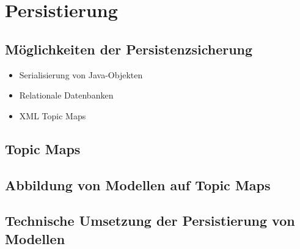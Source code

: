 \chapter{Persistierung} %
\label{cha:persistierung}

\section{Möglichkeiten der Persistenzsicherung} %
\label{sec:möglichkeiten_der_persistenzsicherung}

\begin{itemize}
	\item Serialisierung von Java-Objekten
	\item Relationale Datenbanken
	\item XML Topic Maps
\end{itemize}


\section{Topic Maps} %
\label{sec:topic_maps}


\section{Abbildung von Modellen auf Topic Maps} %
\label{sec:abbildung_von_modellen_auf_topic_maps}


\section{Technische Umsetzung der Persistierung von Modellen} %
\label{sec:technische_umsetzung_der_persistierung_von_modellen}


